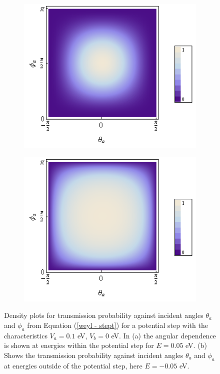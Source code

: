 		\begin{figure}[h]
			 \begin{subfigure}[h]{0.5\textwidth}
				\centerline{\includegraphics[scale=0.5]{images/weyl-step-phi-theta}}
				\caption{}
			\end{subfigure}
			\hspace{0.5cm}
			\begin{subfigure}[h]{0.5\textwidth}
				\centerline{\includegraphics[scale=0.5]{images/weyl-step-phi-theta-2}}
				\caption{}
			\end{subfigure}
			\caption{Density plots for transmission probability against incident angles $\theta_{a}$ and $\phi_{a}$ from Equation (\ref{weyl - stept}) for a potential step with the characteristics $V_{a}=0.1$ eV, $V_{b}=0$ eV. In (a) the angular dependence is shown at energies within the potential step for $E=0.05$ eV. (b) Shows the transmission probability against incident angles $\theta_{a}$ and $\phi_{a}$ at energies outside of the potential step, here $E=-0.05$ eV. }
			\label{weyl-step-1}
		\end{figure}

